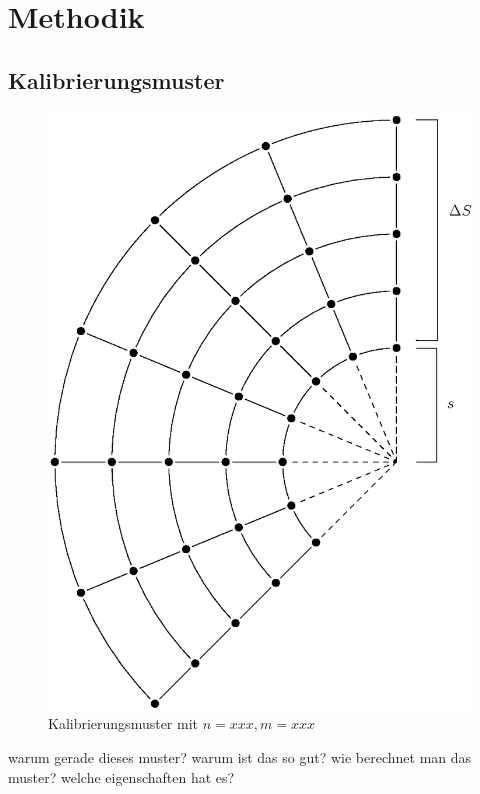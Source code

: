 \chapter{Methodik}
\label{ch:method}


\section{Kalibrierungsmuster}
\label{s:calibrationPattern}

\begin{figure}[!htb]
	\centering
	\includegraphics[scale=.6]{images/calibrationPattern2.eps}
	\caption{Kalibrierungsmuster mit $n = xxx, m = xxx$}
	\label{fig:calibrationPattern}
\end{figure}

warum gerade dieses muster? warum ist das so gut? wie berechnet man das muster? welche eigenschaften hat es?

